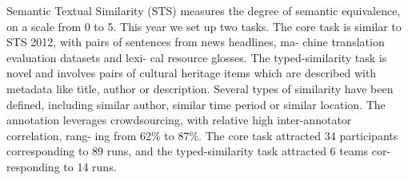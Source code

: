Semantic Textual Similarity (STS) measures the degree of semantic equivalence, on a scale from 0 to 5. This year we set up two tasks. The core task is similar
 to STS 2012, with pairs of sentences from news headlines, ma- chine translation
 evaluation datasets and lexi- cal resource glosses. The typed-similarity task
 is novel and involves pairs of cultural heritage items which are described with
 metadata like title, author or description. Several types of similarity have
 been defined, including similar author, similar time period or similar
 location. The annotation leverages crowdsourcing, with relative high
 inter-annotator correlation, rang- ing from 62\% to 87\%. The core task attracted
 34 participants corresponding to 89 runs, and the typed-similarity task
 attracted 6 teams cor- responding to 14 runs.

